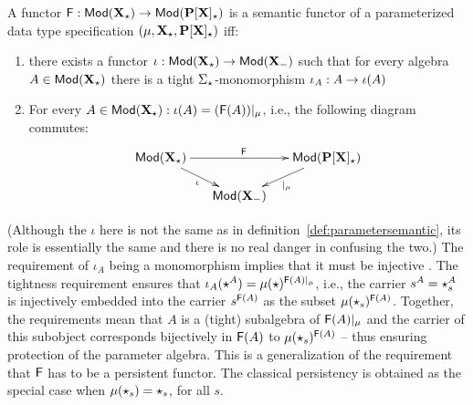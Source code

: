 \begin{fact}\label{fa:parsemAlt}
A functor ${\sf {F}}: {\sf {Mod}}({\bf X_\star}) \to {\sf {Mod}}({\bf P[X]_\star})$ is a
semantic functor of a parameterized data type specification
$(\mu,{\bf X_\star},{\bf P[X]_\star})$ iff:
\begin{enumerate}\MyLPar
\item there exists a functor ${\sf {\iota}}:{\sf {Mod}}({\bf X_\star}) \to
{\sf {Mod}}({\bf X_{-}})$ such that for every algebra $A \in
{\sf {Mod}}({\bf X_\star})$ there is a tight $\Sigma_\star$-monomorphism ${\sf {\iota}}_A: A \to \iota(A)$
\item For every $A\in{\sf {Mod}}({\bf X_\star}): \iota(A) =
({\sf {F}}(A))|_\mu$, i.e., 
the following diagram commutes:
\[ \xymatrix@C=0.5cm@R=0.5cm{
	\Mod(\thr{X_\cons}) \ar[rr]^{\fu{F}} \ar[rd]_{\iota}
			&& \Mod(\thr{P[X]_\cons}) \ar[ld]^{|_\mu} \\
		& \Mod(\thr{X_{\weak}}) \\
								}
\]
	\end{enumerate}
\end{fact}
(Although the $\iota$ here is not the same as in
definition~\ref{def:parametersemantic}, its role is essentially the same and
there is no real danger in confusing the two.)
The requirement of $\iota_A$ being a monomorphism implies that it must
be injective \cite{catrel}. The tightness requirement ensures that
$\iota_A(\star^A)= \mu(\star)^{{\sf {F}}(A) |_{\mu}}$, i.e., the carrier
$s^A=\star_s^A$ is injectively embedded into the carrier $s^{{\sf {F}}(A)}$ as the subset
$\mu(\star_s)^{{\sf {F}}(A)}$. Together, the requirements mean that 
$A$ is a (tight) subalgebra of
${\sf {F}}(A)|_{\mu}$ and the carrier of this subobject corresponds bijectively in ${\sf {F}}(A)$ to
$\mu(\star_s)^{{\sf {F}}(A)}$ -- thus ensuring
protection of the parameter algebra. This is a generalization of the
requirement that ${\sf {F}}$ has to be a persistent functor. The
classical persistency is obtained as the special case when $\mu(\star_s)= \star_s$, for all $s$.


